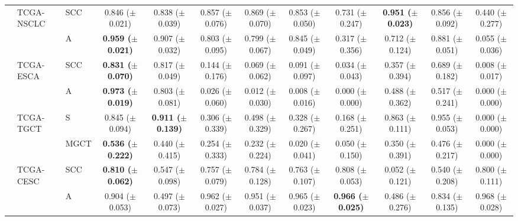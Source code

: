 \documentclass[10pt,twocolumn,letterpaper]{article}
\begin{document}
\begin{table}[!ht]
{{\begin{tabular}{lllcc|ccccc|cc}
                & TCGA-NSCLC       & SCC          & 0.846 ($\pm$0.021)           & 0.838 ($\pm$0.039)           & 0.857 ($\pm$0.076)          & 0.869 ($\pm$0.070)          & 0.853 ($\pm$0.050)          & 0.731 ($\pm$0.247)          & \textbf{0.951 ($\pm$0.023)} & 0.856 ($\pm$0.092)  & 0.440 ($\pm$0.277)    \\
                &                  & A                   & \textbf{0.959 ($\pm$0.021)}  & 0.907 ($\pm$0.032)           & 0.803 ($\pm$0.095)          & 0.799 ($\pm$0.067)          & 0.845 ($\pm$0.049)          & 0.317 ($\pm$0.356)          & 0.712 ($\pm$0.124)          & 0.881 ($\pm$0.051)  & 0.055 ($\pm$0.036)    \\
                & TCGA-ESCA        & SCC          & \textbf{0.831 ($\pm$0.070)}  & 0.817 ($\pm$0.049)           & 0.144 ($\pm$0.176)          & 0.069 ($\pm$0.062)          & 0.091 ($\pm$0.097)          & 0.034 ($\pm$0.043)          & 0.357 ($\pm$0.394)          & 0.689 ($\pm$0.182)  & 0.008 ($\pm$0.017)    \\
                &                  & A                   & \textbf{0.973 ($\pm$0.019)}  & 0.803 ($\pm$0.081)           & 0.026 ($\pm$0.060)          & 0.012 ($\pm$0.030)          & 0.008 ($\pm$0.016)          & 0.000 ($\pm$0.000)          & 0.488 ($\pm$0.362)          & 0.517 ($\pm$0.241)  & 0.000 ($\pm$0.000)    \\
                & TCGA-TGCT        & S & 0.845 ($\pm$0.094)           & \textbf{0.911 ($\pm$0.139)}  & 0.306 ($\pm$0.339)          & 0.498 ($\pm$0.329)          & 0.328 ($\pm$0.267)          & 0.168 ($\pm$0.251)          & 0.863 ($\pm$0.111)          & 0.955 ($\pm$0.053)  & 0.000 ($\pm$0.000)    \\
                &                  & MGCT            & \textbf{0.536 ($\pm$0.222)}  & 0.440 ($\pm$0.415)           & 0.254 ($\pm$0.333)          & 0.232 ($\pm$0.224)          & 0.020 ($\pm$0.041)          & 0.050 ($\pm$0.150)          & 0.350 ($\pm$0.391)          & 0.476 ($\pm$0.217)  & 0.000 ($\pm$0.000)    \\
                & TCGA-CESC        & SCC          & \textbf{0.810 ($\pm$0.062)}  & 0.547 ($\pm$0.098)           & 0.757 ($\pm$0.079)          & 0.784 ($\pm$0.128)          & 0.763 ($\pm$0.107)          & 0.808 ($\pm$0.053)          & 0.052 ($\pm$0.121)          & 0.540 ($\pm$0.208)  & 0.800 ($\pm$0.111)    \\
                &                  & A                   & 0.904 ($\pm$0.053)           & 0.497 ($\pm$0.073)           & 0.962 ($\pm$0.027)          & 0.951 ($\pm$0.037)          & 0.965 ($\pm$0.023)          & \textbf{0.966 ($\pm$0.025)} & 0.486 ($\pm$0.276)          & 0.834 ($\pm$0.135)  & 0.968 ($\pm$0.028)    \\ \midrule\midrule

\end{tabular}}}
\end{table}
\end{document}
